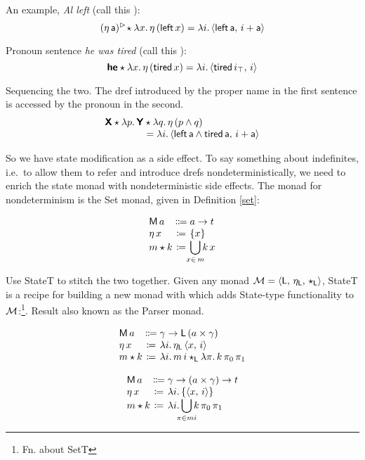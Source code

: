 	An example, \emph{Al left} (call this ):
	\[(\eta\,\textsf{a})^\rhd\! \star \lambda x.\,\eta\,(\textsf{left}\,x) = \lambda i.\,\langle \textsf{left}\,\textsf{a},\,i+\textsf{a} \rangle\]%
	
	Pronoun sentence \emph{he was tired} (call this ):
	\[\textbf{\textsf{he}} \star \lambda x.\,\eta\,(\textsf{tired}\,x) = \lambda i.\,\langle \textsf{tired}\,i_\top,\,i \rangle\]%
	
	Sequencing the two. The dref introduced by the proper name in the first sentence is accessed by the pronoun in the second. %
	\[\begin{array}{r@{}l}
		\bsf{X} \star \lambda p.\,\bsf{Y}&{}\star \lambda q.\,\eta\,(p \wedge q) %
		\\
		&{}= \lambda i.\,\ab{\textsf{left}\,\textsf{a} \wedge \textsf{tired}\,\textsf{a},\,i+\textsf{a}}%
	\end{array}\]
	
	So we have state modification as a side effect. To say something about indefinites, i.e.~to allow them to refer and introduce drefs nondeterministically, we need to enrich the state monad with nondeterministic side effects. The monad for nondeterminism is the Set monad, given in Definition \ref{set}:%
	\begin{defi}\label{set}
		\[\begin{array}[t]
			{@{}l@{}c@{}l@{}}
			\textsf{M}\,a &{}\Coloneqq{} &a \ra t%
			\\
			\eta\,x &{}\ceq{} &\{x\}
			\\
			m \star k &{}\ceq{} &\displaystyle\bigcup_{\mathclap{x\in \,m}}k\,x%
		\end{array}\]
	\end{defi} 

	Use StateT to stitch the two together. Given any monad ${\cal M}= \langle \textsf{L},\,\eta_\textsf{L},\,\star_\textsf{L} \rangle$, StateT is a recipe for building a new monad with which adds State-type functionality to ${\cal M}$:\footnote{Fn. about SetT}. Result also known as the Parser monad. \citealt{HuttonMeijer}%
	\begin{defi}\label{statet}
		\[\begin{array}[t]
			{@{}l@{}c@{}l@{}}
			\textsf{M}\,a &{}\Coloneqq{} &\gamma \ra \textsf{L}\,(a \times \gamma)%
			\\
			\eta\,x &{}\ceq{} &\lambda i .\,\eta_\textsf{L}\,\ab{x,\,i}
			\\
			m \star k &{}\ceq{} &\lambda i.\, m\,i\star_\textsf{L} \lambda \pi.\,k\,\pi_0\,\pi_1%
		\end{array}\]
	\end{defi}
	\begin{defi}\label{stateset}
		\[\begin{array}[t]
			{@{}l@{}c@{}l@{}}
			\textsf{M}\,a &{}\Coloneqq{} &\gamma \ra (a \times \gamma) \ra t%
			\\
			\eta\,x &{}\ceq{} &\lambda i.\left\{\ab{x,\,i}\right\}
			\\
			m \star k &{}\ceq{} &\lambda i.\displaystyle\bigcup_{\mathclap{\pi \in mi}}k\,\pi_0\,\pi_1%
		\end{array}\]
	\end{defi}


